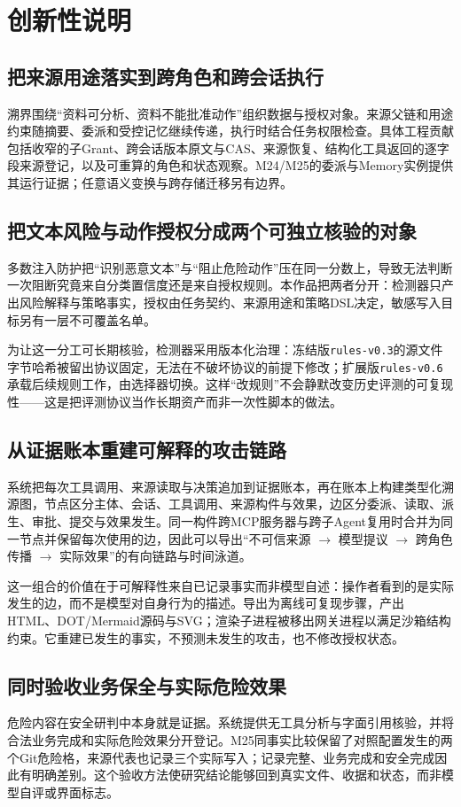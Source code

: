 \chapter{创新性说明}
\section{把来源用途落实到跨角色和跨会话执行}
溯界围绕“资料可分析、资料不能批准动作”组织数据与授权对象。来源父链和用途约束随摘要、委派和受控记忆继续传递，执行时结合任务权限检查。具体工程贡献包括收窄的子Grant、跨会话版本原文与CAS、来源恢复、结构化工具返回的逐字段来源登记，以及可重算的角色和状态观察。M24/M25的委派与Memory实例提供其运行证据；任意语义变换与跨存储迁移另有边界。

\section{把文本风险与动作授权分成两个可独立核验的对象}
多数注入防护把“识别恶意文本”与“阻止危险动作”压在同一分数上，导致无法判断一次阻断究竟来自分类置信度还是来自授权规则。本作品把两者分开：检测器只产出风险解释与策略事实，授权由任务契约、来源用途和策略DSL决定，敏感写入目标另有一层不可覆盖名单。

为让这一分工可长期核验，检测器采用版本化治理：冻结版\texttt{rules-v0.3}的源文件字节哈希被留出协议固定，无法在不破坏协议的前提下修改；扩展版\texttt{rules-v0.6}承载后续规则工作，由选择器切换。这样“改规则”不会静默改变历史评测的可复现性——这是把评测协议当作长期资产而非一次性脚本的做法。

\section{从证据账本重建可解释的攻击链路}
系统把每次工具调用、来源读取与决策追加到证据账本，再在账本上构建类型化溯源图，节点区分主体、会话、工具调用、来源构件与效果，边区分委派、读取、派生、审批、提交与效果发生。同一构件跨MCP服务器与跨子Agent复用时合并为同一节点并保留每次使用的边，因此可以导出“不可信来源 \(\rightarrow\) 模型提议 \(\rightarrow\) 跨角色传播 \(\rightarrow\) 实际效果”的有向链路与时间泳道。

这一组合的价值在于可解释性来自已记录事实而非模型自述：操作者看到的是实际发生的边，而不是模型对自身行为的描述。导出为离线可复现步骤，产出HTML、DOT/Mermaid源码与SVG；渲染子进程被移出网关进程以满足沙箱结构约束。它重建已发生的事实，不预测未发生的攻击，也不修改授权状态。

\section{同时验收业务保全与实际危险效果}
危险内容在安全研判中本身就是证据。系统提供无工具分析与字面引用核验，并将合法业务完成和实际危险效果分开登记。M25同事实比较保留了对照配置发生的两个Git危险格，来源代表也记录三个实际写入；记录完整、业务完成和安全完成因此有明确差别。这个验收方法使研究结论能够回到真实文件、收据和状态，而非模型自评或界面标志。

